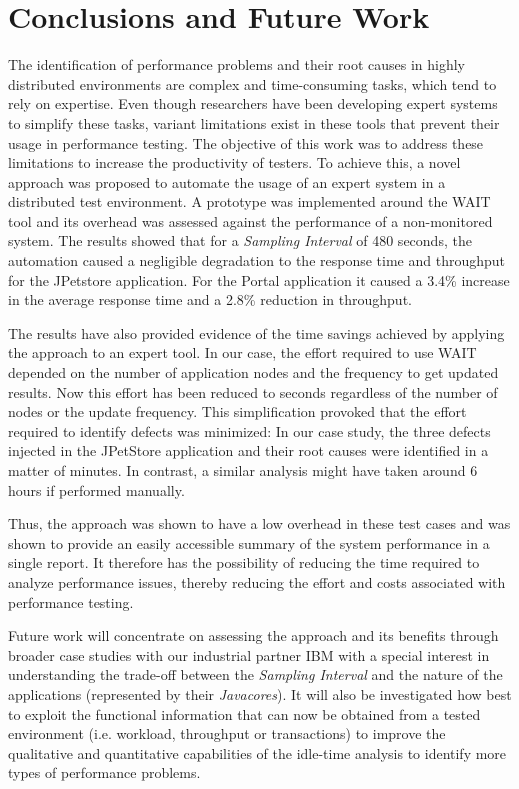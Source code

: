 \documentclass[runningheads,a4paper]{llncs}
\begin{document}
\section{Conclusions and Future Work}
\label{Conclusions}
\vspace{-5pt}
The identification of performance problems and their root
causes in highly distributed environments are complex and time-consuming tasks,
which tend to rely on expertise. Even though researchers have been
developing expert systems to simplify these tasks, variant limitations exist in
these tools that prevent their usage in performance testing. The objective of
this work was to address these limitations to increase the productivity of
testers. To achieve this, a novel approach was proposed to automate the usage of 
an expert system in a distributed test environment. A prototype was implemented
around the WAIT tool and its overhead was assessed against the performance of a
non-monitored system. The results showed that for a \emph{Sampling Interval} of
480 seconds, the automation caused a negligible degradation to the response time
and throughput for the JPetstore application. For the Portal application it caused a 3.4\%
increase in the average response time and a 2.8\% reduction in throughput.

The results have also provided evidence of the time savings achieved by
applying the approach to an expert tool. In our case, the effort required to use
WAIT depended on the number of application nodes and the frequency to get
updated results. Now this effort has been reduced to seconds regardless of the number of
nodes or the update frequency. This simplification provoked that the effort
required to identify defects was minimized: In our case study, the three
defects injected in the JPetStore application and their root causes were
identified in a matter of minutes. In contrast, a similar analysis might have
taken around 6 hours if performed manually.

Thus, the approach was shown to have a low overhead in these test cases and
was shown to provide an easily accessible summary of the system performance in a
single report. It therefore has the possibility of reducing the time required to
analyze performance issues, thereby reducing the effort and costs associated
with performance testing.

Future work will concentrate on assessing the approach and its benefits through
broader case studies with our industrial partner IBM with a special interest in
understanding the trade-off between the \emph{Sampling Interval} and the nature
of the applications (represented by their \emph{Javacores}). It will also be
investigated how best to exploit the functional information that can now be
obtained from a tested environment (i.e. workload, throughput or transactions)
to improve the qualitative and quantitative capabilities of the idle-time
analysis to identify more types of performance problems.
\end{document}
